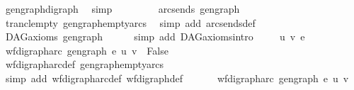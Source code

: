 \begin{isabellebody}
\ gen{\isacharunderscore}{\kern0pt}graph{\isacharunderscore}{\kern0pt}digraph\ \isamarkupfalse%
\ simp\ \ \ \ \ \isanewline
{}\isamarkupfalse%
\isanewline
\ \ \isamarkupfalse%
\ {\isachardoublequoteopen}{\isacharparenleft}{\kern0pt}arcs{\isacharunderscore}{\kern0pt}ends\ gen{\isacharunderscore}{\kern0pt}graph{\isacharparenright}{\kern0pt}\isactrlsup {\isacharplus}{\kern0pt}\ {\isacharequal}{\kern0pt}\ {\isacharbraceleft}{\kern0pt}{\isacharbraceright}{\kern0pt}{\isachardoublequoteclose}\isanewline
\ \ \ \ \isamarkupfalse%
\ trancl{\isacharunderscore}{\kern0pt}empty\ gen{\isacharunderscore}{\kern0pt}graph{\isacharunderscore}{\kern0pt}empty{\isacharunderscore}{\kern0pt}arcs\ \isamarkupfalse%
\ {\isacharparenleft}{\kern0pt}simp\ add{\isacharcolon}{\kern0pt}\ arcs{\isacharunderscore}{\kern0pt}ends{\isacharunderscore}{\kern0pt}def{\isacharparenright}{\kern0pt}\ \isanewline
\ \ \isamarkupfalse%
\ \isamarkupfalse%
\ {\isachardoublequoteopen}DAG{\isacharunderscore}{\kern0pt}axioms\ gen{\isacharunderscore}{\kern0pt}graph{\isachardoublequoteclose}\isanewline
\ \ \ \ \isamarkupfalse%
\ {\isacharparenleft}{\kern0pt}simp\ add{\isacharcolon}{\kern0pt}\ DAG{\isacharunderscore}{\kern0pt}axioms{\isachardot}{\kern0pt}intro{\isacharparenright}{\kern0pt}\ \isanewline
{}\isamarkupfalse%
\isanewline
\ \ \isamarkupfalse%
\ u\ v\ e\ \isanewline
\ \ \isamarkupfalse%
\ {\isachardoublequoteopen}wf{\isacharunderscore}{\kern0pt}digraph{\isachardot}{\kern0pt}arc\ gen{\isacharunderscore}{\kern0pt}graph\ e\ {\isacharparenleft}{\kern0pt}u{\isacharcomma}{\kern0pt}\ v{\isacharparenright}{\kern0pt}\ {\isasymequiv}\ False{\isachardoublequoteclose}\isanewline
\ \ \ \ \isamarkupfalse%
\ wf{\isacharunderscore}{\kern0pt}digraph{\isachardot}{\kern0pt}arc{\isacharunderscore}{\kern0pt}def\ gen{\isacharunderscore}{\kern0pt}graph{\isacharunderscore}{\kern0pt}empty{\isacharunderscore}{\kern0pt}arcs\isanewline
\ \ \ \ \isamarkupfalse%
\ {\isacharparenleft}{\kern0pt}simp\ add{\isacharcolon}{\kern0pt}\ wf{\isacharunderscore}{\kern0pt}digraph{\isachardot}{\kern0pt}arc{\isacharunderscore}{\kern0pt}def\ wf{\isacharunderscore}{\kern0pt}digraph{\isacharunderscore}{\kern0pt}def{\isacharparenright}{\kern0pt}\ \isanewline
\ \ \isamarkupfalse%
\ \isamarkupfalse%
\ {\isachardoublequoteopen}wf{\isacharunderscore}{\kern0pt}digraph{\isachardot}{\kern0pt}arc\ gen{\isacharunderscore}{\kern0pt}graph\ e\ {\isacharparenleft}{\kern0pt}u{\isacharcomma}{\kern0pt}\ v{\isacharparenright}{\kern0pt}\ {\isasymLongrightarrow}\isanewline

\end{isabellebody}
